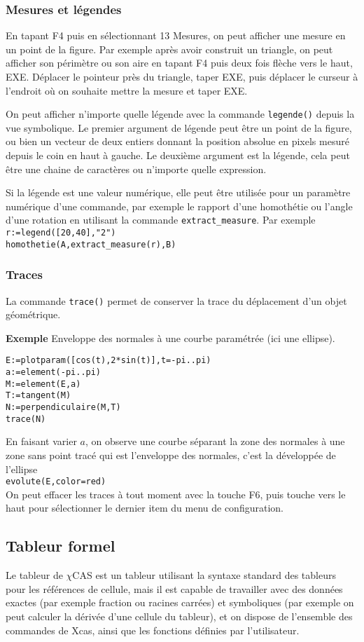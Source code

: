 \documentclass{article}
\begin{document}
\begin{giacjshere}
\subsubsection{Mesures et légendes}
En tapant F4 puis en sélectionnant 13 Mesures,
on peut afficher une mesure en un point de la figure. Par exemple
après avoir construit un triangle, on peut afficher son périmètre
ou son aire en tapant F4 puis deux fois flèche vers le haut, EXE.
Déplacer le pointeur près du triangle, taper EXE, puis déplacer
le curseur à l'endroit où on souhaite mettre la mesure et taper EXE.

On peut afficher n'importe quelle légende avec la commande
\verb|legende()| depuis la vue symbolique. Le premier argument
de légende peut être un point de la figure, ou bien un vecteur
de deux entiers donnant la position absolue en pixels mesuré
depuis le coin en haut à gauche. Le deuxième argument est la légende,
cela peut être une chaine de caractères ou n'importe quelle expression.

Si la légende est une valeur numérique, elle peut être utilisée pour
un paramètre numérique d'une commande, par exemple le rapport d'une
homothétie ou l'angle d'une rotation en utilisant la commande
\verb|extract_measure|. Par exemple
\verb|r:=legend([20,40],"2")|\\
\verb|homothetie(A,extract_measure(r),B)| 

\subsubsection{Traces}
La commande \verb|trace()| permet de conserver la trace du
déplacement d'un objet géométrique.

{\bf Exemple} Enveloppe des normales à une courbe paramétrée
(ici une ellipse).\\
\begin{verbatim}
E:=plotparam([cos(t),2*sin(t)],t=-pi..pi)
a:=element(-pi..pi)
M:=element(E,a)
T:=tangent(M)
N:=perpendiculaire(M,T)
trace(N)
\end{verbatim}
En faisant varier $a$,
on observe une courbe séparant la zone des normales à une zone sans point
tracé qui est l'enveloppe des normales, c'est la développée de l'ellipse\\
\verb|evolute(E,color=red)|\\
On peut effacer les traces à tout moment
avec la touche F6, puis touche vers le haut pour sélectionner
le dernier item du menu de configuration.

\subsection{Tableur formel}
Le tableur de $\chi$CAS est un tableur utilisant la syntaxe standard des
tableurs pour les références de cellule, mais il
est capable de travailler avec des donn\'ees exactes
(par exemple fraction ou racines carr\'ees) et symboliques (par
exemple on peut calculer la d\'eriv\'ee d'une cellule du tableur),
et on dispose de l'ensemble des commandes de Xcas, ainsi que les
fonctions définies par l'utilisateur.


\end{giacjshere}
\end{document}

